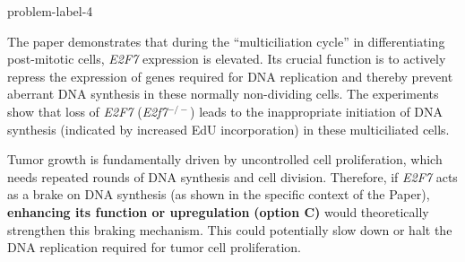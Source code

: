 \begin{problem}{}{problem-label-4}




The paper demonstrates that during the ``multiciliation cycle'' in differentiating post-mitotic cells, \textit{E2F7} expression is elevated. Its crucial function is to actively repress the expression of genes required for DNA replication and thereby prevent aberrant DNA synthesis in these normally non-dividing cells. The experiments show that loss of \textit{E2F7} (\textit{E2f7}$^{-/-}$) leads to the inappropriate initiation of DNA synthesis (indicated by increased EdU incorporation) in these multiciliated cells.

Tumor growth is fundamentally driven by uncontrolled cell proliferation, which needs repeated rounds of DNA synthesis and cell division. Therefore, if \textit{E2F7} acts as a brake on DNA synthesis (as shown in the specific context of the Paper), \textbf{enhancing its function or upregulation} \textbf{(option C)} would theoretically strengthen this braking mechanism. This could potentially slow down or halt the DNA replication required for tumor cell proliferation.

\end{problem}







